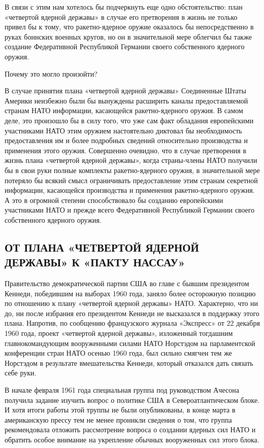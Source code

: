 \documentclass[12pt, a4paper, openany]{book}
\begin{document}
	В связи с этим нам хотелось бы подчеркнуть еще одно обстоятельство: план «четвертой ядерной державы» в случае его претворения в жизнь не только привел бы к тому, что ракетно-ядерное оружие оказалось бы непосредственно в руках боннских военных кругов, но он в значительной мере облегчил бы также создание Федеративной Республикой Германии своего собственного ядерного оружия.
	
	Почему это могло произойти?
	
	В случае принятия плана «четвертой ядерной державы» Соединенные Штаты Америки неизбежно были бы вынуждены расширить каналы предоставляемой странам НАТО информации, касающейся ракетно-ядерного оружия. В самом деле, это произошло бы в силу того, что уже сам факт обладания европейскими участниками НАТО этим оружием настоятельно диктовал бы необходимость предоставления им и более подробных сведений относительно производства и применения этого оружия. Совершенно очевидно, что в случае претворения в жизнь плана «четвертой ядерной державы», когда страны-члены НАТО получили бы в свои руки полные комплекты ракетно-ядерного оружия, в значительной мере потеряло бы всякий смысл ограничивать предоставление этим странам секретной информации, касающейся производства и применения ракетно-ядерного оружия. А это в огромной степени способствовало бы созданию европейскими участниками НАТО и прежде всего Федеративной Республикой Германии своего собственного ядерного оружия.
	
			\subsection[От плана «четвертой ядерной державы» к «пакту Нассау»]{\center ОТ ПЛАНА «ЧЕТВЕРТОЙ ЯДЕРНОЙ ДЕРЖАВЫ» К «ПАКТУ НАССАУ»}

	
	Правительство демократической партии США во главе с бывшим президентом Кеннеди, победившим на выборах 1960 года, заняло более осторожную позицию по отношению к плану «четвертой ядерной державы» НАТО. Характерно, что ни до, ни после избрания его президентом Кеннеди не высказался в поддержку этого плана. Напротив, по сообщению французского журнала «Экспресс» от 22 декабря 1960 года, проект «четвертой ядерной державы», изложенный тогдашним главнокомандующим вооруженными силами НАТО Норстэдом на парламентской конференции стран НАТО осенью 1960 года, был сильно смягчен тем же Норстэдом в результате вмешательства Кеннеди, который отказался дать связать себе руки.
	
	В начале февраля 1961 года специальная группа под руководством Ачесона получила задание изучить вопрос о политике США в Североатлантическом блоке. И хотя итоги работы этой труппы не были опубликованы, в конце марта в американскую прессу тем не менее проникли сведения о том, что группа рекомендовала отложить рассмотрение вопроса о создании ядерных сил НАТО и обратить особое внимание на укрепление обычных вооруженных сил этого блока.
	
\end{document}
